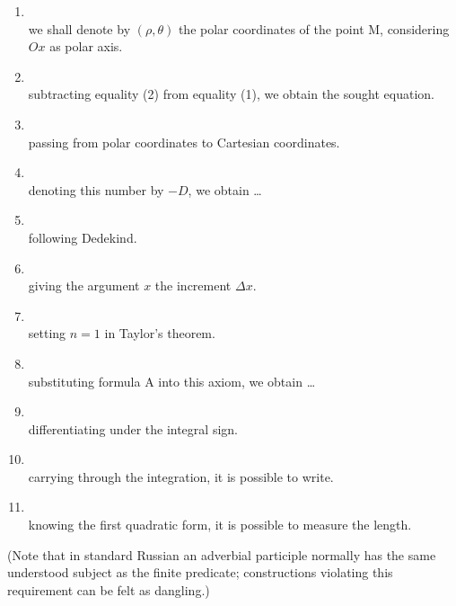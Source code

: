\begin{enumerate}[label=5.\arabic*)]
\item {}\\
      we shall denote by $(\rho,\theta)$ the polar coordinates of the point M, considering $Ox$ as polar axis.
\item {}\\
      subtracting equality (2) from equality (1), we obtain the sought equation.
\item {}\\
      passing from polar coordinates to Cartesian coordinates.
\item {}\\
      denoting this number by $-D$, we obtain \ldots
\item {}\\
      following Dedekind.
\item {}\\
      giving the argument $x$ the increment $\Delta x$.
\item {}\\
      setting $n=1$ in Taylor's theorem.
\item {}\\
      substituting formula A into this axiom, we obtain \ldots
\item {}\\
      differentiating under the integral sign.
\item {}\\
      carrying through the integration, it is possible to write.
\item {}\\
      knowing the first quadratic form, it is possible to measure the length.
\end{enumerate}

(Note that in standard Russian an adverbial participle normally has the same understood subject as the finite predicate; constructions violating this requirement can be felt as dangling.)

